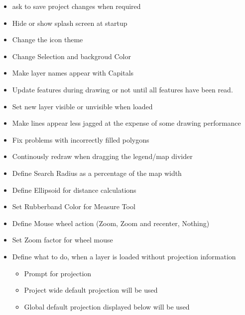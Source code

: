 
\begin{itemize}
\item ask to save project changes when required
\end{itemize}


\begin{itemize}
\item Hide or show splash screen at startup
\item Change the icon theme 
\item Change Selection and backgroud Color
\item Make layer names appear with Capitals
\end{itemize}


\begin{itemize}
\item Update features during drawing or not until all features have been read.
\item Set new layer visible or unvisible when loaded 
\item Make lines appear less jagged at the expense of some drawing performance
\item Fix problems with incorrectly filled polygons
\item Continously redraw when dragging the legend/map divider 
\end{itemize}


\begin{itemize}
\item Define Search Radius as a percentage of the map width
\item Define Ellipsoid for distance calculations
\item Set Rubberband Color for Measure Tool
\item Define Mouse wheel action (Zoom, Zoom and recenter, Nothing)
\item Set Zoom factor for wheel mouse
\end{itemize}


\begin{itemize}
\item Define what to do, when a layer is loaded without projection information
\begin{itemize}
\item Prompt for projection
\item Project wide default projection will be used
\item Global default projection displayed below will be used
\end{itemize}
\end{itemize}

